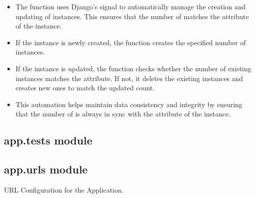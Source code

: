 \documentclass[letterpaper,10pt,english]{sphinxmanual}
\begin{document}
\begin{fulllineitems}
\begin{description}
\begin{itemize}
\item {} 
\sphinxAtStartPar
The  function uses Django’s  signal to automatically 
manage the creation and updating of  instances. This ensures that the 
number of  matches the  attribute of the  
instance.

\item {} 
\sphinxAtStartPar
If the  instance is newly created, the function creates the specified 
number of  instances.

\item {} 
\sphinxAtStartPar
If the  instance is updated, the function checks whether the number of 
existing  instances matches the  attribute. If not, it deletes the 
existing instances and creates new ones to match the updated count.

\item {} 
\sphinxAtStartPar
This automation helps maintain data consistency and integrity by ensuring that the number of 
 is always in sync with the  attribute of the  
instance.

\end{itemize}

\end{description}

\end{fulllineitems}



\subsection{app.tests module}
\label{\detokenize{app:module-app.tests}}\label{\detokenize{app:app-tests-module}}

\subsection{app.urls module}
\label{\detokenize{app:module-app.urls}}\label{\detokenize{app:app-urls-module}}
\sphinxAtStartPar
URL Configuration for the Application.
\end{document}
